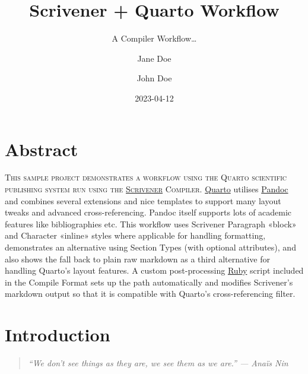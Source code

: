 \documentclass[
  12pt,
  a4paper,
  oneside]{scrbook}
\title{Scrivener + Quarto Workflow}
\subtitle{A Compiler Workflow\ldots{}}
\author{Jane Doe \and John Doe}
\date{2023-04-12}
\renewcommand*\contentsname{Table of contents}
\newcommand\contentsname{Table of contents}
\begin{document}
\frontmatter
\maketitle
\ifdefined\Shaded\renewenvironment{Shaded}{\begin{tcolorbox}[borderline west={3pt}{0pt}{shadecolor}, frame hidden, breakable, boxrule=0pt, sharp corners, interior hidden, enhanced]}{\end{tcolorbox}}\fi

\renewcommand*\contentsname{Table of contents}
{
\hypersetup{linkcolor=}
\setcounter{tocdepth}{2}
\tableofcontents
}
\mainmatter
\hypertarget{abstract}{%
\chapter{Abstract}\label{abstract}}

\protect\hypertarget{scriv2}{}{}

\textsc{This sample project demonstrates a workflow using the Quarto
scientific publishing system run using the
\href{http://literatureandlatte.com}{Scrivener} Compiler}.
\href{http://quarto.org}{Quarto} utilises
\href{http://pandoc.org}{Pandoc} and combines several extensions and
nice templates to support many layout tweaks and advanced
cross-referencing. Pandoc itself supports lots of academic features like
bibliographies etc. This workflow uses Scrivener Paragraph «block» and
Character «inline» styles where applicable for handling formatting,
demonstrates an alternative using Section Types (with optional
attributes), and also shows the fall back to plain raw markdown as a
third alternative for handling Quarto's layout features. A custom
post-processing \href{http://ruby-lang.org}{Ruby} script included in the
Compile Format sets up the path automatically and modifies Scrivener's
markdown output so that it is compatible with Quarto's cross-referencing
filter.

\newpage{}

\protect\hypertarget{scriv3}{}{}

\hypertarget{introduction}{%
\chapter{Introduction}\label{introduction}}

\begin{quote}
\emph{``We don't see things as they are, we see them as we are.'' ---
Anaïs Nin}
\end{quote}
\end{document}
